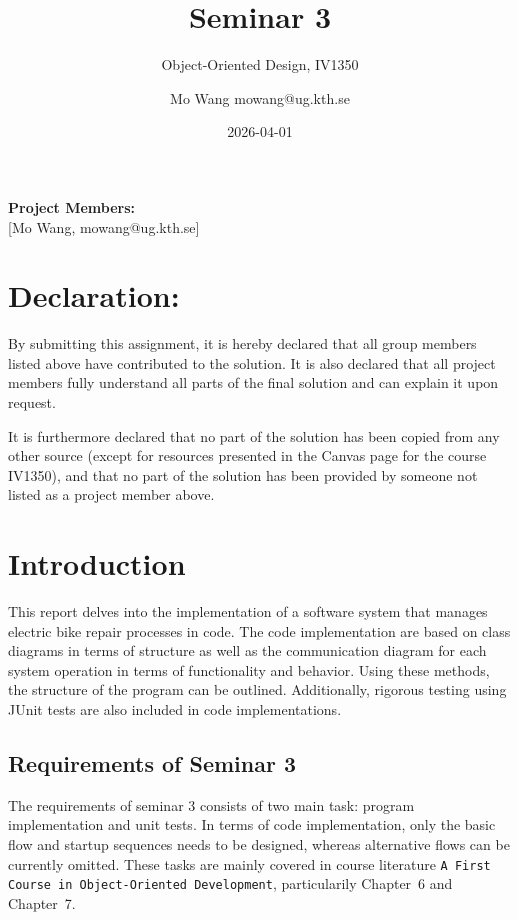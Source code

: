 \documentclass[a4paper]{scrartcl}
\title{Seminar 3}
\subtitle{Object-Oriented Design, IV1350}
\author{Mo Wang mowang@ug.kth.se}
\date{2026-04-01}
\begin{document}
\maketitle
\noindent\textbf{Project Members:} \\ \hfill
[Mo Wang, mowang@ug.kth.se]

\section*{Declaration:}

By submitting this assignment, it is hereby declared that all group members listed above have contributed to the solution. It is also declared that all project members fully understand all parts of the final solution and can explain it upon request.

It is furthermore declared that no part of the solution has been copied from any other source (except for resources presented in the Canvas page for the course IV1350), and that no part of the solution has been provided by someone not listed as a project member above.

\section{Introduction}
\label{sec:intro}


This report delves into the implementation of a software system that manages electric bike repair processes in code. The code implementation are based on class diagrams in terms of structure as well as the communication diagram for each system operation in terms of functionality and behavior. Using these methods, the structure of the program can be outlined. Additionally, rigorous testing using JUnit tests are also included in code implementations.

\subsection{Requirements of Seminar 3}

The requirements of seminar 3 consists of two main task: program implementation and unit tests. In terms of code implementation, only the basic flow and startup sequences needs to be designed, whereas alternative flows can be currently omitted. These tasks are mainly covered in course literature \texttt{A First Course in Object-Oriented Development}, particularily Chapter~6 and Chapter~7.
\end{document}
